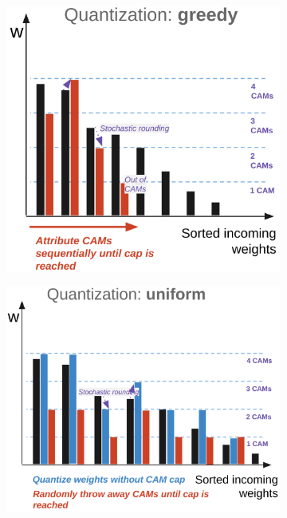 \begin{figure}[t!]
\begin{subfigure}{.4\textwidth}
\centering
\includegraphics[width=\linewidth]{img/chapter4/quantization_greedy.png}
\caption{}
\label{fig:quantization_greedy}
\end{subfigure}
\hfill
\begin{subfigure}{.44\textwidth}
\centering
\includegraphics[width=\linewidth]{img/chapter4/quantization_uniform.png}

\end{subfigure}
\end{figure}
